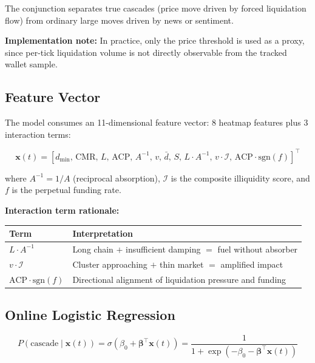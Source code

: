 \documentclass[11pt,a4paper]{article}
\begin{document}
The conjunction separates true cascades (price move driven by forced liquidation flow) from ordinary large moves driven by news or sentiment.

\textbf{Implementation note:} In practice, only the price threshold is used as a proxy, since per-tick liquidation volume is not directly observable from the tracked wallet sample.

\subsection{Feature Vector}

The model consumes an 11-dimensional feature vector: 8 heatmap features plus 3 interaction terms:

\begin{equation}
\mathbf{x}(t) = \left[d_{\min},\, \text{CMR},\, L,\, \text{ACP},\, A^{-1},\, v,\, \bar{d},\, S,\, L \cdot A^{-1},\, v \cdot \mathcal{I},\, \text{ACP} \cdot \text{sgn}(f)\right]^\top
\end{equation}

where $A^{-1} = 1/A$ (reciprocal absorption), $\mathcal{I}$ is the composite illiquidity score, and $f$ is the perpetual funding rate.

\textbf{Interaction term rationale:}

\begin{center}
\begin{tabular}{ll}
\toprule
\textbf{Term} & \textbf{Interpretation} \\
\midrule
$L \cdot A^{-1}$ & Long chain $+$ insufficient damping $=$ fuel without absorber \\
$v \cdot \mathcal{I}$ & Cluster approaching $+$ thin market $=$ amplified impact \\
$\text{ACP} \cdot \text{sgn}(f)$ & Directional alignment of liquidation pressure and funding \\
\bottomrule
\end{tabular}
\end{center}

\subsection{Online Logistic Regression}

\begin{equation}
P(\text{cascade} \mid \mathbf{x}(t)) = \sigma(\beta_0 + \boldsymbol{\beta}^\top \mathbf{x}(t)) = \frac{1}{1 + \exp(-\beta_0 - \boldsymbol{\beta}^\top \mathbf{x}(t))}
\end{equation}
\end{document}

